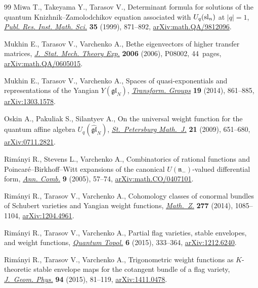 \documentclass[10pt,a4paper]{amsart}
\numberwithin{equation}{section}
\begin{document}
\begin{thebibliography}{99}
Miwa T., Takeyama Y., Tarasov V., Determinant formula for solutions of the
 quantum {K}nizhnik--{Z}amolodchikov equation associated with {$U_q({\rm
 sl}_n)$} at {$|q|=1$},
 \href{https://doi.org/10.2977/prims/1195143360}{\textit{Publ. Res. Inst.
 Math. Sci.}} \textbf{35} (1999), 871--892,
 \href{http://arxiv.org/abs/math.QA/9812096}{arXiv:math.QA/9812096}.

Mukhin E., Tarasov V., Varchenko A., Bethe eigenvectors of higher transfer
 matrices,
 \href{https://doi.org/10.1088/1742-5468/2006/08/p08002}{\textit{J.~Stat.
 Mech. Theory Exp.}} \textbf{2006} (2006), P08002, 44~pages,
 \href{http://arxiv.org/abs/math.QA/0605015}{arXiv:math.QA/0605015}.

Mukhin E., Tarasov V., Varchenko A., Spaces of quasi-exponentials and
 representations of the {Y}angian {$Y(\mathfrak{gl}_N)$},
 \href{https://doi.org/10.1007/s00031-014-9275-8}{\textit{Transform. Groups}}
 \textbf{19} (2014), 861--885,
 \href{http://arxiv.org/abs/1303.1578}{arXiv:1303.1578}.

Oskin A., Pakuliak S., Silantyev A., On the universal weight function for the
 quantum affine algebra {$U_q(\widehat{\mathfrak{gl}}_N)$},
 \href{https://doi.org/10.1090/S1061-0022-2010-01110-5}{\textit{St.~Petersburg
 Math.~J.}} \textbf{21} (2009), 651--680,
 \href{http://arxiv.org/abs/0711.2821}{arXiv:0711.2821}.

Rim\'anyi R., Stevens L., Varchenko A., Combinatorics of rational functions and
 {P}oincar\'e--{B}irkhoff--{W}itt expansions of the canonical
 {$U(\mathfrak{n}_-)$}-valued differential form,
 \href{https://doi.org/10.1007/s00026-005-0241-3}{\textit{Ann. Comb.}}
 \textbf{9} (2005), 57--74,
 \href{http://arxiv.org/abs/math.CO/0407101}{arXiv:math.CO/0407101}.

Rim\'anyi R., Tarasov V., Varchenko A., Cohomology classes of conormal bundles
 of {S}chubert varieties and {Y}angian weight functions,
 \href{https://doi.org/10.1007/s00209-014-1295-5}{\textit{Math.~Z.}}
 \textbf{277} (2014), 1085--1104,
 \href{http://arxiv.org/abs/1204.4961}{arXiv:1204.4961}.

Rim\'anyi R., Tarasov V., Varchenko A., Partial flag varieties, stable
 envelopes, and weight functions,
 \href{https://doi.org/10.4171/QT/65}{\textit{Quantum Topol.}} \textbf{6}
 (2015), 333--364, \href{http://arxiv.org/abs/1212.6240}{arXiv:1212.6240}.

Rim\'anyi R., Tarasov V., Varchenko A., Trigonometric weight functions as
 {$K$}-theoretic stable envelope maps for the cotangent bundle of a flag
 variety,
 \href{https://doi.org/10.1016/j.geomphys.2015.04.002}{\textit{J.~Geom.
 Phys.}} \textbf{94} (2015), 81--119,
 \href{http://arxiv.org/abs/1411.0478}{arXiv:1411.0478}.


\end{thebibliography}
\end{document}
